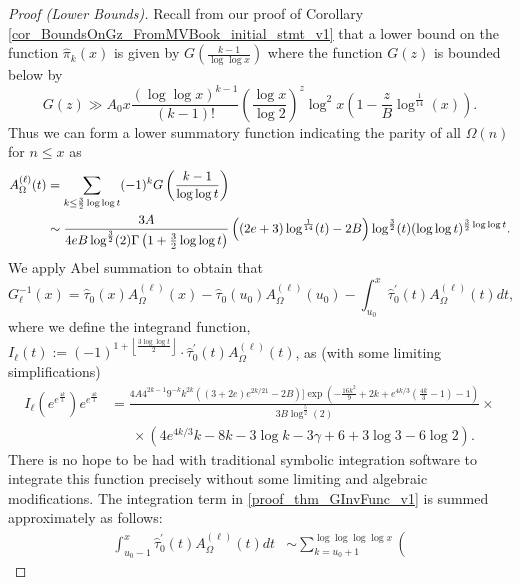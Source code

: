\documentclass[11pt,reqno,a4letter]{article}
\numberwithin{figure}{section}
\numberwithin{table}{section}
\newcommand{\Floor}[2]{\ensuremath{\left\lfloor \frac{#1}{#2} \right\rfloor}}
\theoremstyle{plain}
\numberwithin{theorem}{section}
\theoremstyle{definition}
\begin{document}
\begin{proof}[Proof (Lower Bounds)] 
Recall from our proof of Corollary \ref{cor_BoundsOnGz_FromMVBook_initial_stmt_v1} that 
a lower bound on the function $\widehat{\pi}_k(x)$ is given by $G\left(\frac{k-1}{\log\log x}\right)$ 
where the function $G(z)$ is bounded below by 
\[
G(z) \gg A_0 x \frac{(\log\log x)^{k-1}}{(k-1)!} \left(\frac{\log x}{\log 2}\right)^{z} \log^2 x \left( 
     1 - \frac{z}{B} \log^{\frac{1}{14}}(x)\right). 
\]
Thus we can form a lower summatory function indicating the parity of all $\Omega(n)$ for $n \leq x$ as 
\begin{align} 
\notag 
A_{\Omega}^{(\ell)}(t) & = \sum_{k \leq \frac{3}{2}\log\log t} (-1)^k G\left(\frac{k-1}{\log\log t}\right) \\ 
\label{proof_thm_GInvFunc_v0} 
     & \sim \frac{3A}{4eB \log^{\frac{3}{2}}(2) \Gamma\left(1 + \frac{3}{2}\log\log t\right)} \left( 
     (2e+3) \log^{\frac{1}{14}}(t) - 2B\right) 
     \log^{\frac{3}{2}}(t) (\log\log t)^{\frac{3}{2}\log\log t}. 
\end{align} 
We apply Abel summation to obtain that 
\begin{equation} 
\label{proof_thm_GInvFunc_v1} 
G_{\ell}^{-1}(x) = \widehat{\tau}_0(x) A_{\Omega}^{(\ell)}(x) - 
     \widehat{\tau}_0(u_0) A_{\Omega}^{(\ell)}(u_0) - \int_{u_0}^{x} \widehat{\tau}_0^{\prime}(t) 
     A_{\Omega}^{(\ell)}(t) dt, 
\end{equation} 
where we define the integrand function, 
$I_{\ell}(t) := (-1)^{1+\Floor{3\log\log t}{2}} \cdot \widehat{\tau}_0^{\prime}(t) A_{\Omega}^{(\ell)}(t)$, as 
(with some limiting simplifications) 
\begin{align*} 
I_{\ell}\left(e^{e^{\frac{4k}{3}}}\right) e^{e^{\frac{4k}{3}}} & = 
     \frac{4A 4^{2 k-1} 9^{-k} k^{2k} \left((3+2 e) e^{2k/21}-2 B\right) ]
     \exp \left(-\frac{16 k^2}{9}+2k+e^{4k/3} 
     \left(\frac{4k}{3}-1\right)-1\right)}{3B \log ^{\frac{5}{2}}(2)} \times \\ 
     & \phantom{=\ } \times 
     \left(4 e^{4 k/3} k-8k-3 \log k-3 \gamma +6+3 
     \log 3-6 \log 2\right).
\end{align*} 
There is no hope to be had with traditional symbolic integration software to integrate 
this function precisely without some limiting and algebraic modifications. The integration term 
in \eqref{proof_thm_GInvFunc_v1} is summed approximately as follows: 
\begin{align*} 
\int_{u_0-1}^{x} \widehat{\tau}_0^{\prime}(t) A_{\Omega}^{(\ell)}(t) dt & \sim 
     \sum_{k=u_0+1}^{\log\log\log\log x} \left( 

\end{align*}
\end{proof}
\end{document}
